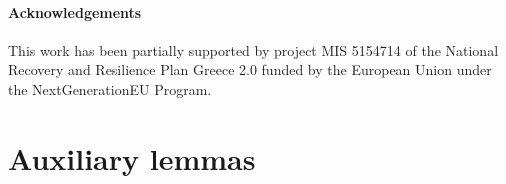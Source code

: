 \documentclass[reqno]{amsart}
\theoremstyle{plain}
\newtheorem{lemma}{Lemma}	%
\theoremstyle{definition}
\theoremstyle{remark}
\newcommand{\R}{\mathbb{R}}	%
\begin{document}
\paragraph{\textbf{Acknowledgements}} This work has been partially supported by project MIS 5154714 of the National Recovery and Resilience Plan Greece 2.0 funded by the European Union under the NextGenerationEU Program.



\appendix
{}


\section{Auxiliary lemmas}
\label{app:aux}


\end{document}
